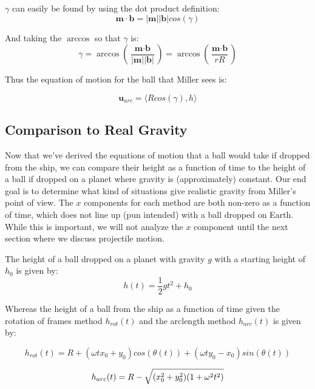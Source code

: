 \documentclass{amsart}
\renewcommand{\vec}{\textbf}
\theoremstyle{definition}
\begin{document}
$\gamma$ can easily be found by using the dot product definition:
\[\vec{m}\cdot\vec{b}= \lvert \vec{m} \rvert \lvert \vec{b} \rvert cos(\gamma)\]

And taking the $\arccos$ so that $\gamma$ is:
\begin{equation}
\gamma  = \arccos\left(\frac{\vec{m}\cdot \vec{b}}{\lvert \vec{m} \rvert \lvert \vec{b} \rvert}\right) 
 = \arccos\left (\frac{\vec{m}\cdot \vec{b}}{rR}\right)
\end{equation}

Thus the equation of motion for the ball that Miller sees is:

\begin{equation}\label{eq:uV1}
    \vec{u}_{arc} = \langle R cos(\gamma), h \rangle
\end{equation}




\subsection*{Comparison to Real Gravity}

Now that we've derived the equations of motion that a ball would take
if dropped from the ship, we can compare their height as a function of
time to the height of a ball if dropped on a planet where gravity is
(approximately) constant. Our end goal is to determine what kind of
situations give realistic gravity from Miller's point of view. The $x$
components for each method are both non-zero as a function of time,
which does not line up (pun intended) with a ball dropped on
Earth. While this is important, we will not analyze the $x$ component
until the next section where we discuss projectile motion.

The height of a ball dropped on a planet with gravity $g$ with a starting height of $h_0$ is given by:
\begin{equation}
    h(t)=\frac{1}{2}gt^2 +h_0
\end{equation}

Whereas the height of a ball from the ship as a function of time given the rotation of frames method $h_{rot}(t)$ and the arclength method $h_{arc}(t)$ is given by:

\begin{equation}
    h_{rot}(t) = R+(\omega t x_0 + y_0)cos(\theta(t))+(\omega t y_0 - x_0)sin(\theta (t))
\end{equation}

\begin{equation}
    h_{arc}(t) = R - \sqrt{(x_0^2+y_0^2)(1+\omega^2 t^2)} \\
\end{equation}
\end{document}
